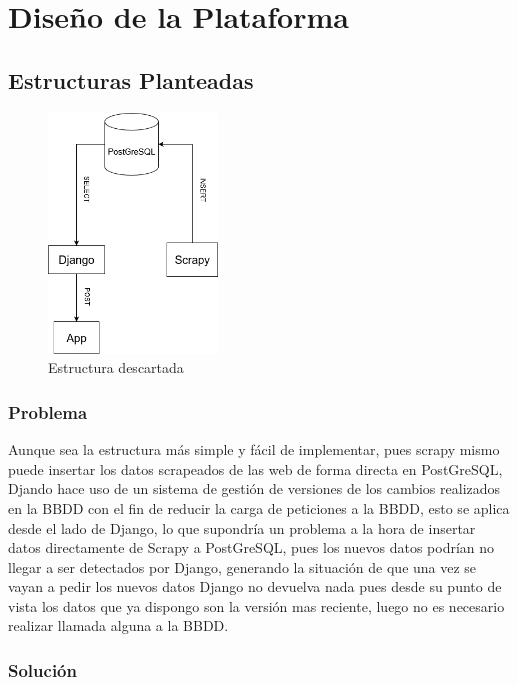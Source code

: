 \chapter[Diseño de la Plataforma]{Diseño de la Plataforma}
\label{Chap4}

\section{Estructuras Planteadas}

\begin{figure} [H]
	\centering
	\includegraphics[width=0.4\textwidth]{fig/estructura_descartada.png}
	\caption[Idea original de la estructura de datos planteada]{Estructura descartada}
	\label{fig:ej9}
\end{figure}

\subsection{Problema}
Aunque sea la estructura más simple y fácil de implementar, pues scrapy mismo puede insertar los datos scrapeados de las web de forma directa en PostGreSQL, Djando hace uso de un sistema de gestión de versiones de los cambios realizados en la BBDD con el fin de reducir la carga de peticiones a la BBDD, esto se aplica desde el lado de Django, lo que supondría un problema a la hora de insertar datos directamente de Scrapy a PostGreSQL, pues los nuevos datos podrían no llegar a ser detectados por Django, generando la situación de que una vez se vayan a pedir los nuevos datos Django no devuelva nada pues desde su punto de vista los datos que ya dispongo son la versión mas reciente, luego no es necesario realizar llamada alguna a la BBDD.

\subsection{Solución}

